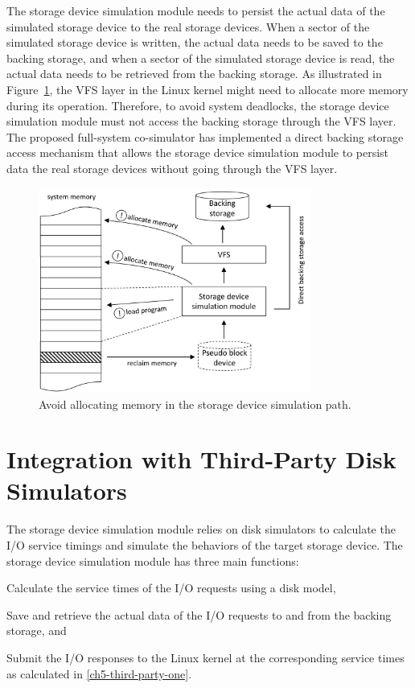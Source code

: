 The storage device simulation module needs to persist the actual data of the simulated storage device to the real storage devices.  When a sector of the simulated storage device is written, the actual data needs to be saved to the backing storage, and when a sector of the simulated storage device is read, the actual data needs to be retrieved from the backing storage. As illustrated in Figure~\ref{fig:ch5-direct-backing-storage}, the VFS layer in the Linux kernel might need to allocate more memory during its operation. Therefore, to avoid system deadlocks, the storage device simulation module must not access the backing storage through the VFS layer. The proposed full-system co-simulator has implemented a direct backing storage access mechanism that allows the storage device simulation module to persist data the real storage devices without going through the VFS layer.

\begin{figure}[htpb]
	\centering
	\includegraphics[width=0.8\textwidth]{figures/ch5-direct-backing-storage.pdf}
	\caption{\label{fig:ch5-direct-backing-storage}Avoid allocating memory in the storage device simulation path.}
\end{figure}


\section{Integration with Third-Party Disk Simulators}
\label{sec:disk-simulator-integration}

The storage device simulation module relies on disk simulators to calculate the I/O service timings and simulate the behaviors of the target storage device. The storage device simulation module has three main functions:
\begin{enumerate*}[label=(\arabic*)]
	\item \label{ch5-third-party-one} Calculate the service times of the I/O requests using a disk model, 
	\item \label{ch5-third-party-two} Save and retrieve the actual data of the I/O requests to and from the backing storage, and
	\item \label{ch5-third-party-three} Submit the I/O responses to the Linux kernel at the corresponding service times as calculated in \ref{ch5-third-party-one}.
\end{enumerate*}

